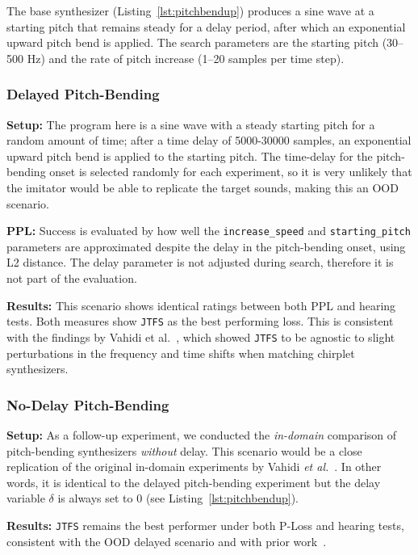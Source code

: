 \documentclass{article}
\newcommand{\JTFS}{\texttt{JTFS}\xspace}
\begin{document}
The base synthesizer (Listing~\ref{lst:pitchbendup}) produces a sine wave at a starting pitch that remains steady for a delay period, after which an exponential upward pitch bend is applied. The search parameters are the starting pitch (30–500 Hz) and the rate of pitch increase (1–20 samples per time step).


\subsubsection{Delayed Pitch-Bending}
\label{sec:delayed_chirplet}
\textbf{Setup:} The program here is a sine wave with a steady starting pitch for a random amount of time; after a time delay of 5000-30000 samples, an exponential upward pitch bend is applied to the starting pitch. The time-delay for the pitch-bending onset is selected randomly for each experiment, so it is very unlikely that the imitator would be able to replicate the target sounds, making this an OOD scenario. 

\noindent \textbf{PPL:} Success is evaluated by how well the \texttt{increase\_speed} and \texttt{starting\_pitch} parameters are approximated despite the delay in the pitch-bending onset, using L2 distance. The delay parameter is not adjusted during search, therefore it is not part of the evaluation.

\noindent \textbf{Results:} This scenario shows identical ratings between both PPL and hearing tests. Both measures show \JTFS as the best performing loss. This is consistent with the findings by Vahidi et al.~\cite{vahidi2023mesostructures}, which showed \JTFS to be agnostic to slight perturbations in the frequency and time shifts when matching chirplet synthesizers. 

\subsubsection{No-Delay Pitch-Bending}
\label{sec:no_delayed_chirplet}
\textbf{Setup:} As a follow-up experiment, we conducted the \textit{in-domain} comparison of pitch-bending synthesizers \textit{without} delay. This scenario would be a close replication of the original in-domain experiments by Vahidi \textit{et al.}~\cite{vahidi2023mesostructures}. In other words, it is identical to the delayed pitch-bending experiment but the delay variable $\delta$ is always set to 0 (see Listing~\ref{lst:pitchbendup}).  

\noindent \textbf{Results:} \JTFS remains the best performer under both P-Loss and hearing tests, consistent with the OOD delayed scenario and with prior work~\cite{vahidi2023mesostructures}. 
\end{document}
